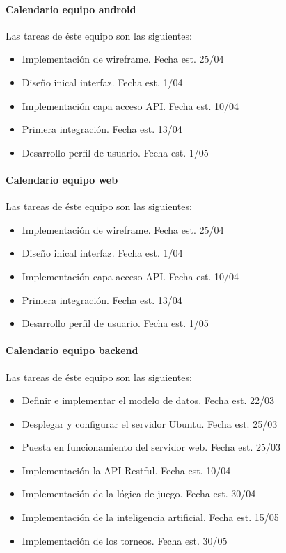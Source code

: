 \documentclass{article}
\begin{document}
\paragraph{Calendario equipo android}

Las tareas de éste equipo son las siguientes:
\begin{itemize}

    \item Implementación de wireframe. Fecha est. 25/04
    \item Diseño inical interfaz. Fecha est. 1/04
    \item Implementación capa acceso API. Fecha est. 10/04
    \item Primera integración. Fecha est. 13/04
    \item Desarrollo perfil de usuario. Fecha est. 1/05
\end{itemize}

\paragraph{Calendario equipo web}

Las tareas de éste equipo son las siguientes:
\begin{itemize}

    \item Implementación de wireframe. Fecha est. 25/04
    \item Diseño inical interfaz. Fecha est. 1/04
    \item Implementación capa acceso API. Fecha est. 10/04
    \item Primera integración. Fecha est. 13/04
    \item Desarrollo perfil de usuario. Fecha est. 1/05
\end{itemize}
\paragraph{Calendario equipo backend}


Las tareas de éste equipo son las siguientes:
\begin{itemize}
    \item Definir e implementar el modelo de datos. Fecha est. 22/03
    \item Desplegar y configurar el servidor Ubuntu. Fecha est. 25/03
    \item Puesta en funcionamiento del servidor web. Fecha est. 25/03
    \item Implementación la API-Restful. Fecha est. 10/04
    \item Implementación de la lógica de juego. Fecha est. 30/04
    \item Implementación de la inteligencia artificial. Fecha est. 15/05
    \item Implementación de los torneos. Fecha est. 30/05
\end{itemize}
\end{document}
